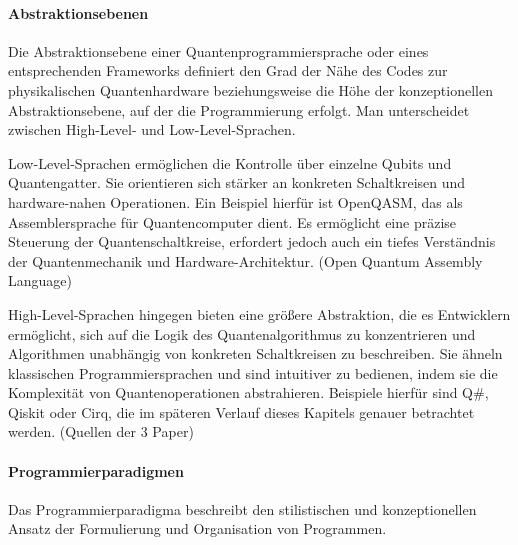 \paragraph{Abstraktionsebenen} 
Die Abstraktionsebene einer Quantenprogrammiersprache oder eines entsprechenden Frameworks definiert den Grad der Nähe des Codes zur physikalischen Quantenhardware beziehungsweise die Höhe der konzeptionellen Abstraktionsebene, auf der die Programmierung erfolgt.
Man unterscheidet zwischen High-Level- und Low-Level-Sprachen. 

Low-Level-Sprachen ermöglichen die Kontrolle über einzelne Qubits und Quantengatter. Sie orientieren sich stärker an konkreten Schaltkreisen und hardware-nahen Operationen. Ein Beispiel hierfür ist OpenQASM, das als Assemblersprache für Quantencomputer dient. Es ermöglicht eine präzise Steuerung der Quantenschaltkreise, erfordert jedoch auch ein tiefes Verständnis der Quantenmechanik und Hardware-Architektur. (Open Quantum Assembly Language)

High-Level-Sprachen hingegen bieten eine größere Abstraktion, die es Entwicklern ermöglicht, sich auf die Logik des Quantenalgorithmus zu konzentrieren und Algorithmen unabhängig von konkreten Schaltkreisen zu beschreiben. Sie ähneln klassischen Programmiersprachen und sind intuitiver zu bedienen, indem sie die Komplexität von Quantenoperationen abstrahieren. Beispiele hierfür sind Q\#, Qiskit oder Cirq, die im späteren Verlauf dieses Kapitels genauer betrachtet werden. (Quellen der 3 Paper)

\paragraph{Programmierparadigmen} 
Das Programmierparadigma beschreibt den stilistischen und konzeptionellen Ansatz der Formulierung und Organisation von Programmen.

